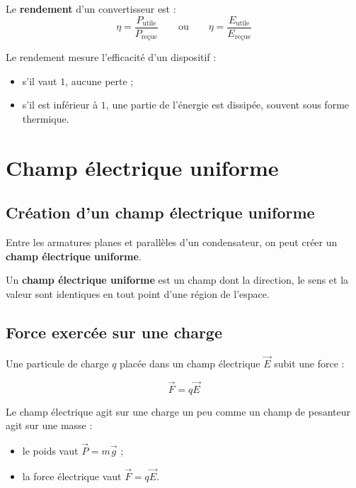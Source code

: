 \documentclass[11pt,a4paper]{article}
\begin{document}
\begin{definitionbox}
Le \textbf{rendement} d'un convertisseur est :
\[
\eta = \frac{P_{\text{utile}}}{P_{\text{reçue}}}
\qquad \text{ou} \qquad
\eta = \frac{E_{\text{utile}}}{E_{\text{reçue}}}
\]
\end{definitionbox}

\begin{interpretation}
Le rendement mesure l'efficacité d'un dispositif :
\begin{itemize}
    \item s'il vaut \(1\), aucune perte ;
    \item s'il est inférieur à \(1\), une partie de l'énergie est dissipée, souvent sous forme thermique.
\end{itemize}
\end{interpretation}

\section{Champ électrique uniforme}

\subsection{Création d'un champ électrique uniforme}

Entre les armatures planes et parallèles d'un condensateur, on peut créer un \textbf{champ électrique uniforme}.

\begin{definitionbox}
Un \textbf{champ électrique uniforme} est un champ dont la direction, le sens et la valeur sont identiques en tout point d'une région de l'espace.
\end{definitionbox}

\subsection{Force exercée sur une charge}

Une particule de charge \(q\) placée dans un champ électrique \(\vec{E}\) subit une force :

\[
\vec{F} = q\vec{E}
\]

\begin{interpretation}
Le champ électrique agit sur une charge un peu comme un champ de pesanteur agit sur une masse :
\begin{itemize}
    \item le poids vaut \(\vec{P}=m\vec{g}\) ;
    \item la force électrique vaut \(\vec{F}=q\vec{E}\).
\end{itemize}
\end{interpretation}
\end{document}
